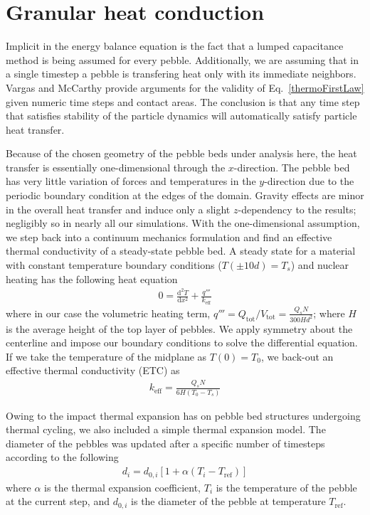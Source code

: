 \section{Granular heat conduction}

Implicit in the energy balance equation is the fact that a lumped capacitance method is being assumed for every pebble. Additionally, we are assuming that in a single timestep a pebble is transfering heat only with its immediate neighbors. Vargas and McCarthy\cite{Vargas2001} provide arguments for the validity of Eq.~\ref{thermoFirstLaw} given numeric time steps and contact areas. The conclusion is that any time step that satisfies stability of the particle dynamics will automatically satisfy particle heat transfer.%

Because of the chosen geometry of the pebble beds under analysis here, the heat transfer is essentially one-dimensional through the $x$-direction. The pebble bed has very little variation of forces and temperatures in the $y$-direction due to the periodic boundary condition at the edges of the domain. Gravity effects are minor in the overall heat transfer and induce only a slight $z$-dependency  to the results; negligibly so in nearly all our simulations. With the one-dimensional assumption, we step back into a continuum mechanics formulation and find an effective thermal conductivity of a steady-state pebble bed. A steady state for a material with constant temperature boundary conditions ($T(\pm 10d) = T_s$) and nuclear heating has the following heat equation
\begin{align}\label{heateqn}
0 = \frac{\mathrm{d}^2T}{\mathrm{d}x^2} + \frac{q'''}{k_\text{eff}}
\end{align}
where in our case the volumetric heating term, $q''' = Q_\text{tot}/V_\text{tot} = \frac{Q_sN}{300Hd^2}$; where $H$ is the average height of the top layer of pebbles. We apply symmetry about the centerline and impose our boundary conditions to solve the differential equation. If we take the temperature of the midplane as $T(0) = T_0$, we back-out an effective thermal conductivity (ETC) as
\begin{align}\label{eq:etc}
k_\text{eff} = \frac{Q_sN}{6H(T_0-T_s)}
\end{align}


Owing to the impact thermal expansion has on pebble bed structures undergoing thermal cycling\cite{Tanigawa:2010cr, Vargas2007, Chen2009}, we also included a simple thermal expansion model.  The diameter of the pebbles was updated after a specific number of timesteps according to the following
\begin{align}
d_i = d_{0,i}\left[1+\alpha\left(T_i - T_\text{ref}\right)\right]
\end{align}
where $\alpha$ is the thermal expansion coefficient, $T_i$ is the temperature of the pebble at the current step, and $d_{0,i}$ is the diameter of the pebble at temperature $T_\text{ref}$.



